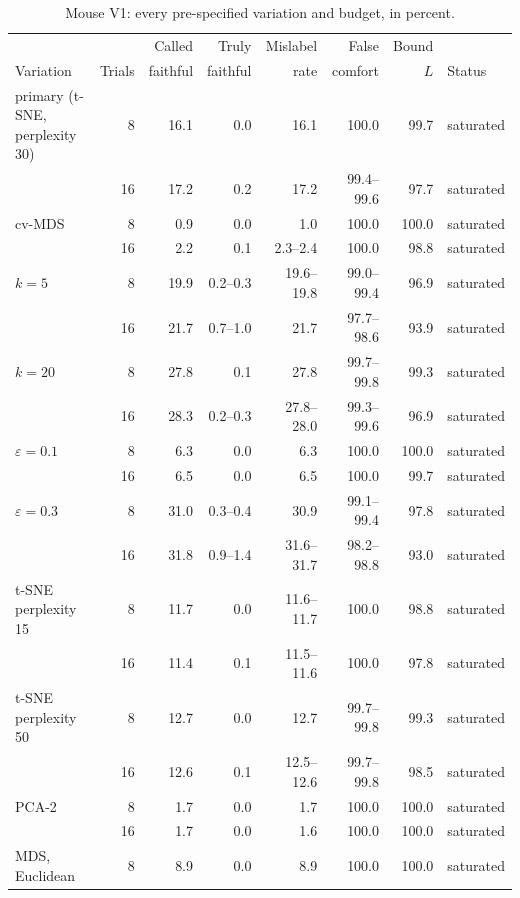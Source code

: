 \documentclass[11pt]{article}
\begin{document}
\begin{table}[!htb]
\centering\scriptsize
\caption{Mouse V1: every pre-specified variation and budget, in percent.}
\begin{tabular}{lrrrrrrl}
\toprule
 & & Called & Truly & Mislabel & False & Bound & \\
Variation & Trials & faithful & faithful & rate & comfort & $L$ & Status \\
\midrule
primary (t-SNE, perplexity 30) & 8 & 16.1 & 0.0 & 16.1 & 100.0 & 99.7 & saturated \\
 & 16 & 17.2 & 0.2 & 17.2 & 99.4--99.6 & 97.7 & saturated \\
\addlinespace
cv-MDS & 8 & 0.9 & 0.0 & 1.0 & 100.0 & 100.0 & saturated \\
 & 16 & 2.2 & 0.1 & 2.3--2.4 & 100.0 & 98.8 & saturated \\
\addlinespace
$k=5$ & 8 & 19.9 & 0.2--0.3 & 19.6--19.8 & 99.0--99.4 & 96.9 & saturated \\
 & 16 & 21.7 & 0.7--1.0 & 21.7 & 97.7--98.6 & 93.9 & saturated \\
\addlinespace
$k=20$ & 8 & 27.8 & 0.1 & 27.8 & 99.7--99.8 & 99.3 & saturated \\
 & 16 & 28.3 & 0.2--0.3 & 27.8--28.0 & 99.3--99.6 & 96.9 & saturated \\
\addlinespace
$\varepsilon=0.1$ & 8 & 6.3 & 0.0 & 6.3 & 100.0 & 100.0 & saturated \\
 & 16 & 6.5 & 0.0 & 6.5 & 100.0 & 99.7 & saturated \\
\addlinespace
$\varepsilon=0.3$ & 8 & 31.0 & 0.3--0.4 & 30.9 & 99.1--99.4 & 97.8 & saturated \\
 & 16 & 31.8 & 0.9--1.4 & 31.6--31.7 & 98.2--98.8 & 93.0 & saturated \\
\addlinespace
t-SNE perplexity 15 & 8 & 11.7 & 0.0 & 11.6--11.7 & 100.0 & 98.8 & saturated \\
 & 16 & 11.4 & 0.1 & 11.5--11.6 & 100.0 & 97.8 & saturated \\
\addlinespace
t-SNE perplexity 50 & 8 & 12.7 & 0.0 & 12.7 & 99.7--99.8 & 99.3 & saturated \\
 & 16 & 12.6 & 0.1 & 12.5--12.6 & 99.7--99.8 & 98.5 & saturated \\
\addlinespace
PCA-2 & 8 & 1.7 & 0.0 & 1.7 & 100.0 & 100.0 & saturated \\
 & 16 & 1.7 & 0.0 & 1.6 & 100.0 & 100.0 & saturated \\
\addlinespace
MDS, Euclidean & 8 & 8.9 & 0.0 & 8.9 & 100.0 & 100.0 & saturated \\

\end{tabular}
\end{table}
\end{document}
